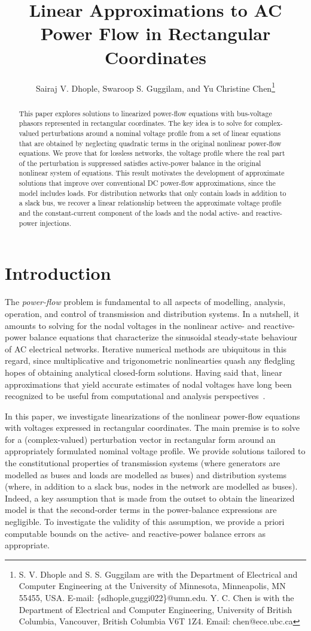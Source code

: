 \documentclass[10 pt, conference]{ieeeconf}
\title{Linear Approximations to AC Power Flow in Rectangular Coordinates}
\author{Sairaj V. Dhople, Swaroop S. Guggilam, and Yu Christine Chen\thanks{S. V. Dhople and S. S. Guggilam are with the Department of Electrical and Computer Engineering at the University of Minnesota, Minneapolis, MN 55455, USA. E-mail: \{sdhople,guggi022\}@umn.edu. 
Y. C. Chen is with the Department of Electrical and Computer Engineering, University of British Columbia, Vancouver, British Columbia V6T 1Z4. Email: chen@ece.ubc.ca}}
\begin{document}
\maketitle
\thispagestyle{empty}
\pagestyle{empty}

\begin{abstract}
This paper explores solutions to linearized power-flow equations with bus-voltage phasors represented in rectangular coordinates. The key idea is to solve for complex-valued perturbations around a nominal voltage profile from a set of linear equations that are obtained by neglecting quadratic terms in the original nonlinear power-flow equations. We prove that for lossless networks, the voltage profile where the real part of the perturbation is suppressed satisfies active-power balance in the original nonlinear system of equations. This result motivates the development of approximate solutions that improve over conventional DC power-flow approximations, since the model includes  loads. For distribution networks that only contain  loads in addition to a slack bus, we recover a linear relationship between the approximate voltage profile and the constant-current component of the loads and the nodal active- and reactive-power injections.  
\end{abstract}

\section{Introduction}
The \emph{power-flow} problem is fundamental to all aspects of modelling, analysis, operation, and control of transmission and distribution systems. In a nutshell, it amounts to solving for the nodal voltages in the nonlinear active- and reactive-power balance equations that characterize the sinusoidal steady-state behaviour of AC electrical networks.  Iterative numerical methods are ubiquitous in this regard, since multiplicative and trigonometric nonlinearties quash any fledgling hopes of obtaining analytical closed-form solutions. Having said that, linear approximations that yield accurate estimates of nodal voltages have long been recognized to be useful from computational and analysis perspectives~\cite{Stott-2009,Saverio-2015}.

In this paper, we investigate linearizations of the nonlinear power-flow equations with voltages expressed in rectangular coordinates. The main premise is to solve for a (complex-valued) perturbation vector in rectangular form around an appropriately formulated nominal voltage profile. We provide solutions tailored to the constitutional properties of transmission systems (where generators are modelled as  buses and loads are modelled as  buses) and distribution systems (where, in addition to a slack bus, nodes in the network are modelled as  buses). Indeed, a key assumption that is made from the outset to obtain the linearized model is that the second-order terms in the power-balance expressions are negligible. To investigate the validity of this assumption, we provide a priori computable bounds on the active- and reactive-power balance errors as appropriate. 
\end{document}
